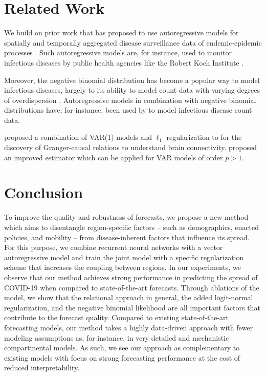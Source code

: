 \documentclass[nobib]{tufte-handout}
\begin{document}
\section{Related Work}
\label{sec:org4064e60}
We build on prior work that has proposed to use autoregressive models
for spatially and temporally aggregated disease surveillance data of endemic-epidemic
processes \citep{held2005statistical,meyer2014powerlaw,meyer2016socialcontact}.
Such autoregressive models are, for instance, used to monitor infectious
diseases by public health agencies like the Robert Koch Institute
\citep{salmon2016surveillance}.

Moreover, the negative binomial distribution has become a popular way to model
infectious diseases, largely to its ability to model count data with varying degrees
of overdispersion \citep{lloyd_smith2007negativebinomial}. Autoregressive models
in combination with negative binomial distributions have, for instance, been
used by \citet{bauer2018stratified,wakefield2019spatio,held2005statistical} to
model infectious disease count data.

\citet{valdes2005estimating} proposed a combination of VAR(1) models and \(\ell_1\)
regularization to for the discovery of Granger-causal relations to understand
brain connectivity. \citet{haufe2010sparse} proposed an improved estimator which
can be applied for VAR models of order \(p > 1\).

\section{Conclusion}
\label{sec:org29e484b}
To improve the quality and robustness of forecasts, we propose a new method
which aims to disentangle region-specific factors -- such as demographics,
enacted policies, and mobility -- from disease-inherent factors that influence
its spread. For this purpose, we combine recurrent neural networks with a vector
autoregressive model and train the joint model with a specific regularization
scheme that increases the coupling between regions. In our experiments, we
observe that our method achieves strong performance in predicting the spread of
COVID-19 when compared to state-of-the-art forecasts. Through ablations of the
model, we show that the relational approach in general, the added logit-normal
regularization, and the negative binomial likelihood are all important factors
that contribute to the forecast quality. Compared to existing state-of-the-art
forecasting models, our method takes a highly data-driven approach with fewer
modeling assumptions as, for instance, in very detailed and mechanistic
compartmental models. As such, we see our approach as complementary to existing
models with focus on strong forecasting performance at the cost of reduced
interpretability.



\newpage
\printbibliography
\end{document}
